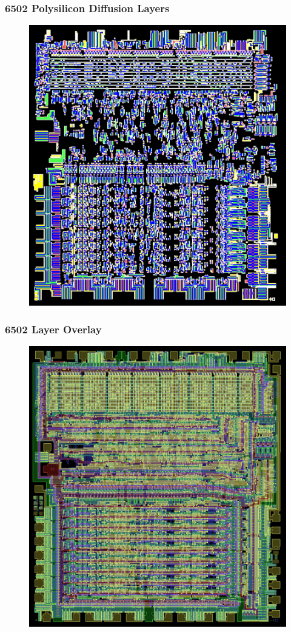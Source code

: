 \documentclass{beamer}
\begin{document}
\begin{frame}
\frametitle{6502 Polysilicon Diffusion Layers}
\begin{figure}
\centering
\includegraphics[scale=0.2]{images/polylayers.png}
\end{figure}
\end{frame}

\begin{frame}
\frametitle{6502 Layer Overlay}
\begin{figure}
\centering
\includegraphics[scale=0.2]{images/all.png}
\end{figure}
\end{frame}
\end{document}
